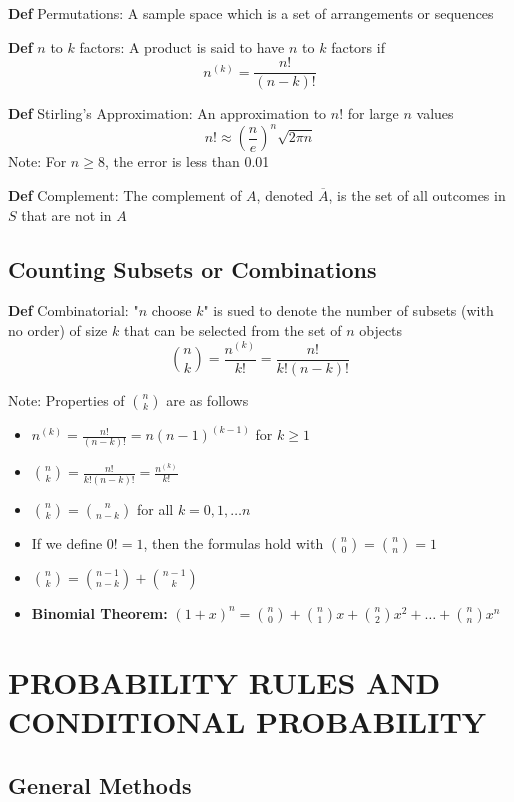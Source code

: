 \documentclass[11pt,notitlepage]{report}
\begin{document}
\textbf{Def} Permutations: A sample space which is a set of arrangements or sequences

\textbf{Def} $n$ to $k$ factors: A product is said to have $n$ to $k$ factors if
$$n^{(k)} = \frac{n!}{(n-k)!}$$

\textbf{Def} Stirling’s Approximation: An approximation to $n!$ for large $n$ values
$$n! \approx \left(\frac{n}{e}\right)^n \sqrt{2\pi n}$$
\hspace*{5mm} Note: For $n \geq 8$, the error is less than 0.01

\textbf{Def} Complement: The complement of $A$, denoted $\overline{A}$, is the set of all outcomes in $S$ that are not in $A$



\section{Counting Subsets or Combinations}

\textbf{Def} Combinatorial: "$n$ choose $k$" is sued to denote the number of subsets (with no order) of size $k$ that can be selected from the set of $n$ objects
$$\binom{n}{k} = \frac{n^{(k)}}{k!} = \frac{n!}{k!(n-k)!}$$

\hspace*{5mm} Note: Properties of $\binom{n}{k}$ are as follows
\begin{itemize}
    \item $n^{(k)} = \frac{n!}{(n-k)!} = n(n-1)^{(k-1)}$ for $k \geq 1$
    \item $\binom{n}{k} = \frac{n!}{k!(n-k)!} = \frac{n^{(k)}}{k!}$
    \item $\binom{n}{k} = \binom{n}{n-k}$ for all $k = 0, 1,\dots n$
    \item If we define $0! = 1$, then the formulas hold with $\binom{n}{0} = \binom{n}{n} = 1$
    \item $\binom{n}{k} = \binom{n-1}{n-k} + \binom{n-1}{k}$
    \item \textbf{Binomial Theorem: } $(1+x)^n = \binom{n}{0} + \binom{n}{1}x + \binom{n}{2}x^2 + \dots + \binom{n}{n}x^n$
\end{itemize}


\chapter{PROBABILITY RULES AND CONDITIONAL PROBABILITY}

\section{General Methods}
\end{document}
